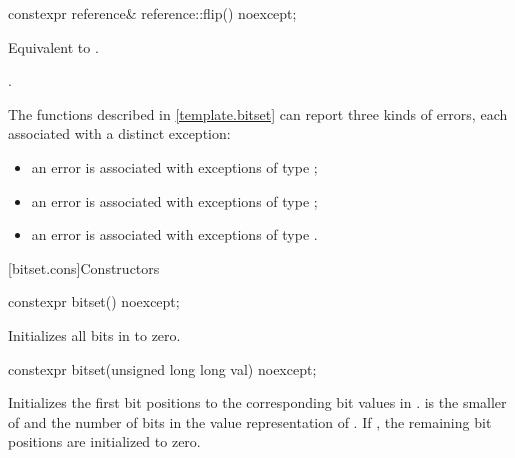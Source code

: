 %
\begin{itemdecl}
constexpr reference& reference::flip() noexcept;
\end{itemdecl}

\begin{itemdescr}
\pnum
\effects
Equivalent to .

\pnum
\returns
{}.
\end{itemdescr}

\pnum
The functions described in \ref{template.bitset} can report three kinds of
errors, each associated with a distinct exception:
\begin{itemize}
\item
an
error is associated with exceptions of type
;
%
\item
an
error is associated with exceptions of type
;
%
\item
an
error is associated with exceptions of type
.
%
\end{itemize}

[bitset.cons]{Constructors}

%
\begin{itemdecl}
constexpr bitset() noexcept;
\end{itemdecl}

\begin{itemdescr}
\pnum
\effects
Initializes all bits in  to zero.
\end{itemdescr}

%
\begin{itemdecl}
constexpr bitset(unsigned long long val) noexcept;
\end{itemdecl}

\begin{itemdescr}
\pnum
\effects
Initializes the first  bit positions to the corresponding bit
values in .
 is the smaller of  and the number of bits in the value
representation of .
If , the remaining bit positions are initialized to zero.
\end{itemdescr}


